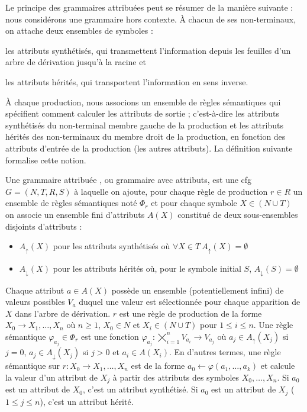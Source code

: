 Le principe des grammaires attribuées peut se résumer de la manière suivante : nous considérons une grammaire hors contexte.
À chacun de ses non-terminaux, on attache deux ensembles de symboles :
\begin{enumerate*}[label=(\arabic*)]
    \item les attributs synthétisés, qui transmettent l'information depuis les feuilles d'un arbre de dérivation jusqu'à la racine et
    \item les attributs hérités, qui transportent l'information en sens inverse.
\end{enumerate*}
À chaque production, nous associons un ensemble de règles sémantiques qui spécifient comment calculer les attributs de sortie ; c'est-à-dire les attributs synthétisés du non-terminal membre gauche de la production et les attributs hérités des non-terminaux du membre droit de la production, en fonction des attributs d'entrée de la production (les autres attributs).
La définition suivante formalise cette notion.

\begin{definition}
    \label{def:struct:G-attr}
    Une grammaire attribuée \cite{knuthSemanticsContextfreeLanguages1968}, ou grammaire avec attributs, est une \gls{cfg} $G = (N, T, R, S)$ à laquelle on ajoute, pour chaque règle de production $r \in R$ un ensemble de règles sémantiques noté $\Phi_r$ et pour chaque symbole $X \in (N \cup T)$ on associe un ensemble fini d'attributs $A(X)$ constitué de deux sous-ensembles disjoints d'attributs :
    \begin{itemize}
        \item $A_\uparrow(X)$ pour les attributs synthétisés où $\forall X \in T ~ A_\uparrow(X) = \emptyset$
        \item $A_\downarrow(X)$ pour les attributs hérités où, pour le symbole initial $S$, $A_\downarrow(S) = \emptyset$
    \end{itemize}
    Chaque attribut $a \in A(X)$ possède un ensemble (potentiellement infini) de valeurs possibles $V_a$ duquel une valeur est sélectionnée pour chaque apparition de $X$ dans l'arbre de dérivation.
    $r$ est une règle de production de la forme $X_0 \to X_1, \dots, X_n$ où $n \ge 1$, $X_0 \in N$ et $X_i \in (N \cup T)$ pour $1 \le i \le n$.
    Une règle sémantique $\varphi_{a_j} \in \Phi_r$ est une fonction $\varphi_{a_j} : \bigtimes_{i = 1}^n V_{a_i} \to V_{a_j}$ où $a_j \in A_\uparrow(X_j)$ si $j = 0$, $a_j \in A_\downarrow(X_j)$ si $j > 0$ et $a_i \in A(X_i)$.
    En d'autres termes, une règle sémantique sur $r: X_0 \to X_1, \dots, X_n$ est de la forme $a_0 \gets \varphi(a_1, \dots, a_k)$ et calcule la valeur d'un attribut de $X_j$ à partir des attributs des symboles $X_0, \dots, X_n$.
    Si $a_0$ est un attribut de $X_0$, c'est un attribut synthétisé.
    Si $a_0$ est un attribut de $X_j$ ($1 \leq j \leq n$), c'est un attribut hérité.
\end{definition}

